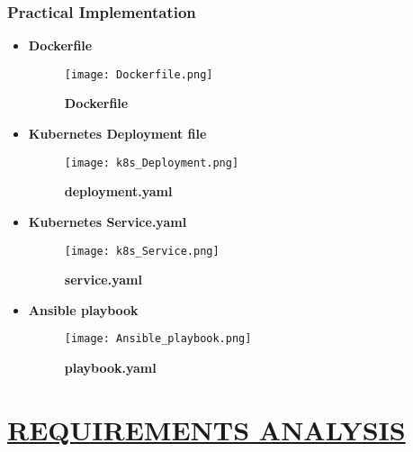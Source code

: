 \documentclass[12pt,oneside,a4paper]{report}
\begin{document}
\subsection{Practical Implementation}
\begin{itemize}
\item \textbf{Dockerfile}

\begin{figure}[h]
\centering
\texttt{[image: Dockerfile.png]}
\caption{\textbf{Dockerfile}}
\label{fig_Dockerfile}
\end{figure}
\item \textbf{Kubernetes Deployment file}

\begin{figure}[h]
\centering
\texttt{[image: k8s\_Deployment.png]}
\caption{\textbf{deployment.yaml}}
\label{fig_k8s_deployment_file}
\end{figure}
\newpage
\item \textbf{Kubernetes Service.yaml}

\begin{figure}[h]
\centering
\texttt{[image: k8s\_Service.png]}
\caption{\textbf{service.yaml}}
\label{fig_k8s_service_file}
\end{figure}

\item \textbf{Ansible playbook }

\begin{figure}[h]
\centering
\texttt{[image: Ansible\_playbook.png]}
\caption{\textbf{playbook.yaml}}
\label{fig_ansible_playbook_file}
\end{figure}
\end{itemize}

\chapter{\underline{REQUIREMENTS ANALYSIS}}
\end{document}
